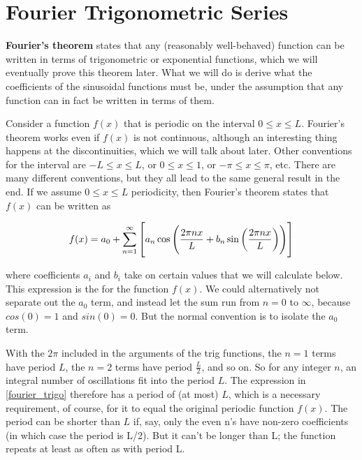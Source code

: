 
\section{Fourier Trigonometric Series}
\textbf{Fourier's theorem} states that any (reasonably well-behaved) function can be written in terms of trigonometric or exponential functions, which we will eventually prove this theorem later. What we will do is derive what the coefficients of the sinusoidal functions must be, under the assumption that any function can in fact be written in terms of them.

Consider a function $f(x)$ that is periodic on the interval $0 \le x \le L$. Fourier's theorem works even if $f(x)$ is not continuous, although an interesting thing happens at the discontinuities, which we will talk about later. Other conventions for the interval are $-L \le x \le L$, or $0 \le x \le 1$, or $-\pi \le x \le \pi$, etc. There are many different conventions, but they all lead to the same general result in the end. If we assume $0 \le x \le L$ periodicity, then Fourier's theorem states that $f(x)$ can be written as

\begin{equation}\label{fourier_trigo}
f(x) = a_0 + \sum_{n=1}^\infty \left[a_n\cos\left(\frac{2\pi nx}{L}+b_n\sin\left(\frac{2\pi nx}{L}\right)\right)\right]
\end{equation}

where coefficients $a_i$ and $b_i$ take on certain values that we will calculate below. This expression is the  for the function $f(x)$. We could alternatively not separate out the $a_0$ term, and instead let the sum run from $n=0$ to $\infty$, because $cos(0) = 1$ and $sin(0) = 0$. But the normal convention is to isolate the $a_0$ term.

With the $2\pi$ included in the arguments of the trig functions, the $n=1$ terms have period $L$, the $n=2$ terms have period $\frac{L}{2}$, and so on. So for any integer $n$, an integral number of oscillations fit into the period $L$. The expression in \cref{fourier_trigo} therefore has a period of (at most) $L$, which is a necessary requirement, of course, for it to equal the original periodic function $f(x)$. The period can be shorter than $L$ if, say, only the even n's have non-zero coefficients (in which case the period is L/2). But it can't be longer than L; the function repeats at least as often as with period L.

